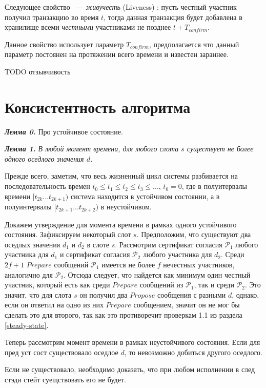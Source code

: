 \noindent Следующее свойство ~--- \textit{живучесть} (Liveness) \cite{hybrid-consensus}:
пусть честный участник получил транзакцию во время $t$, тогда данная транзакция будет добавлена в хранилище всеми \textit{честными} участниками не позднее $t + T_{confirm}$.

Данное свойство использует параметр $T_{confirm}$, предполагается что данный параметр постоянен на протяжении всего времени и известен зараннее.

TODO отзывчивость

\section{Консистентность алгоритма}

\textbf{\textit{Лемма 0.}} Про устойчивое состояние.

\textbf{\textit{Лемма 1.}} \textit{В любой момент времени, для любого слота $s$ существует не более одного оседлого значения $d$.}

Прежде всего, заметим, что весь жизненный цикл системы разбивается на последовательность времен
$t_0 \le t_1 \le t_2 \le t_3 \le ...$, $t_0=0$, где в полуитервалы времени $[t_{2k}...t_{2k+1})$ система находится в устойчивом состоянии, а в полуинтервалы $[t_{2k+1}...t_{2k+2})$ в неустойчивом.

Докажем утверждение для момента времени в рамках одного устойчивого состояния.
Зафиксируем некоторый слот $s$. Предположим, что существуют два оседлых значения $d_1$ и $d_2$ в слоте $s$. Рассмотрим сертификат согласия $\mathcal{P}_1$ любого участника для $d_1$ и сертификат согласия $\mathcal{P}_2$ любого участника для $d_2$. Среди $2f+1$ $Prepare$ сообщений $\mathcal{P}_1$ имеется не более $f$ нечестных участников, аналогично для $\mathcal{P}_2$. Отсюда следует, что найдется как минимум один честный участник, который есть как среди $Prepare$ сообщений из $\mathcal{P}_1$, так и среди $\mathcal{P}_2$. Это значит, что для слота $s$ он получил два $Propose$ сообщения с разными $d$, однако, если он ответил на одно из них $Prepare$ сообщением, значит он не мог бы сделать это для второго, так как это противоречит проверкам 1.1 из раздела \ref{steady-state}.

Теперь рассмотрим момент времени в рамках неустойчивого состояния. 
Если для пред уст сост существовало оседлое $d$, то невозможно добиться другого оседлого.

Если не существовало, необходимо доказать, что при любом исполнении в след стэди стейт суещствовать его не будет.


